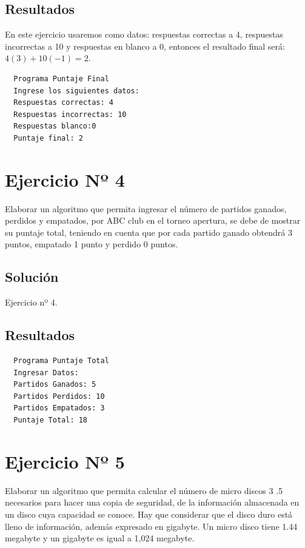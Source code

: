 \subsection{Resultados}
En este ejercicio usaremos como datos: respuestas correctas a 4, respuestas
incorrectas a 10 y respuestas en blanco a 0, entonces el resultado final será:
$4(3) + 10(-1) = 2$.
\begin{verbatim}
  Programa Puntaje Final
  Ingrese los siguientes datos:
  Respuestas correctas: 4
  Respuestas incorrectas: 10
  Respuestas blanco:0
  Puntaje final: 2
\end{verbatim}
\section{Ejercicio Nº 4}
Elaborar un algoritmo que permita ingresar el número de partidos ganados,
perdidos y empatados, por ABC club en el torneo apertura, se debe de mostrar su
puntaje total, teniendo en cuenta que por cada partido ganado obtendrá 3
puntos, empatado 1 punto y perdido 0 puntos.
\subsection{Solución}
\begin{longlisting}
	\caption{Ejercicio nº 4.}\label{cod:ex_4}
\end{longlisting}
\subsection{Resultados}
\begin{verbatim}
  Programa Puntaje Total
  Ingresar Datos:   
  Partidos Ganados: 5
  Partidos Perdidos: 10
  Partidos Empatados: 3
  Puntaje Total: 18
\end{verbatim}
\section{Ejercicio Nº 5}
Elaborar un algoritmo que permita calcular el número de micro discos 3 .5
necesarios para hacer una copia de seguridad, de la información almacenada en
un disco cuya capacidad se conoce. Hay que considerar que el disco duro está
lleno de información, además expresado en gigabyte. Un micro disco tiene 1.44
megabyte y un gigabyte es igual a 1,024 megabyte.
